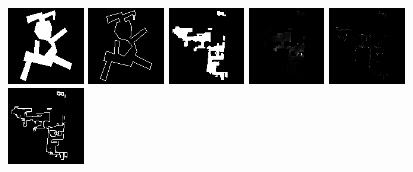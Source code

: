 \begin{figure}[h!]
\begin{minipage}[b]{\linewidth}
	\begin{center}
		\includegraphics[width=2cm]{figures/results/samples/cond/sample26_map_heightmap_true.png}
		\includegraphics[width=2cm]{figures/results/samples/cond/sample26_map_wallmap_true.png}
		\hfill 
		\includegraphics[width=2cm]{figures/results/samples/cond/sample26_map_floormap_generated.png}
		\includegraphics[width=2cm]{figures/results/samples/cond/sample26_map_heightmap_generated.png}
		\includegraphics[width=2cm]{figures/results/samples/cond/sample26_map_thingsmap_generated.png}
		\includegraphics[width=2cm]{figures/results/samples/cond/sample26_map_wallmap_generated.png}
	\end{center}
	

\end{minipage}
\end{figure}
